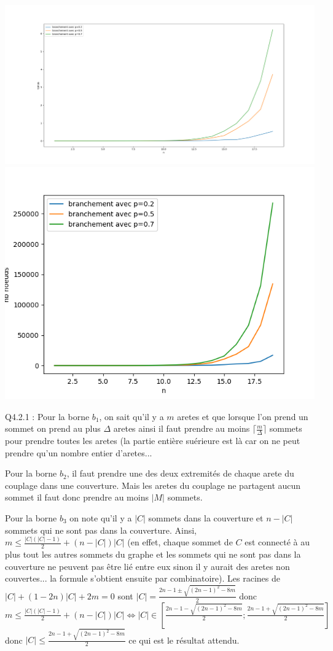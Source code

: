 \documentclass[a4paper]{article}
\begin{document}
\includegraphics[scale=0.3]{"./test_branchement.png"}
\includegraphics[scale=0.8]{"./test_nb_noeuds_branchement.png"}

Q4.2.1 : Pour la borne $b_1$, on sait qu'il y a $m$ aretes et que lorsque l'on prend un sommet on prend au plus $\Delta$ aretes ainsi il faut prendre au moins $ \lceil \frac{m}{\Delta} \rceil $ sommets pour prendre toutes les aretes (la partie entière suérieure est là car on ne peut prendre qu'un nombre entier d'aretes...

Pour la borne $b_2$, il faut prendre une des deux extremités de chaque arete du couplage dans une couverture. Mais les aretes du couplage ne partagent aucun sommet il faut donc prendre au moins $|M|$ sommets.

Pour la borne $b_3$ on note qu'il y a $|C|$ sommets dans la couverture et $n-|C|$ sommets qui ne sont pas dans la couverture. Ainsi,  $m \leq \frac{|C|(|C|-1)}{2} + (n-|C|)|C|$ (en effet, chaque sommet de $C$ est connecté à au plus tout les autres sommets du graphe et les sommets qui ne sont pas dans la couverture ne peuvent pas être lié entre eux sinon il y aurait des aretes non couvertes... la formule s'obtient ensuite par combinatoire). Les racines de $|C| + (1-2n)|C| + 2m = 0$ sont $|C| = \frac{2n - 1 \pm \sqrt{(2n-1)^2 - 8m}}{2}$ donc $m \leq \frac{|C|(|C|-1)}{2} + (n-|C|)|C| \iff |C| \in [\frac{2n - 1 - \sqrt{(2n-1)^2 - 8m}}{2};\frac{2n - 1 + \sqrt{(2n-1)^2 - 8m}}{2}]$ donc $|C| \leq \frac{2n - 1 + \sqrt{(2n-1)^2 - 8m}}{2}$ ce qui est le résultat attendu. \\
\end{document}
